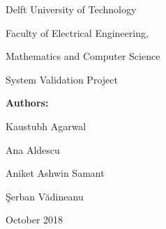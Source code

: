\begin{titlepage}
	\begin{center}
		{\Large Delft University of Technology}
		\par\vspace*{2mm}
		{\Large Faculty of Electrical Engineering,
		
		        Mathematics and Computer Science}
		\par\vspace*{3mm}
		
		\par\vspace*{35mm}
		{\Huge System Validation Project}
		\par\vspace*{30mm}
		\vspace*{1mm} \Large \textbf{\Large Authors:}\vspace*{1mm} \\
		\par\vspace*{1mm}
		{\Large Kaustubh Agarwal
		
		\Large Ana Aldescu
		
        \Large Aniket Ashwin Samant
        
        \Large Şerban Vădineanu
        }

		\par\vspace*{60mm}
		\Large October 2018
	\end{center}
\end{titlepage}
